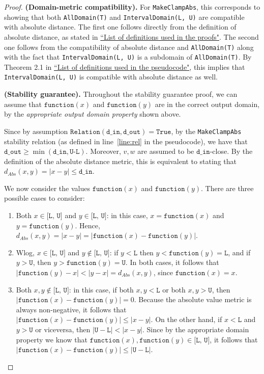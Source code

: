 \documentclass[11pt,a4paper]{article}
\theoremstyle{definition}
\newcommand{\din}{\texttt{d\_in}}
\newcommand{\dout}{\texttt{d\_out}}
\newcommand{\Relation}{\texttt{Relation}}
\newcommand{\True}{\texttt{True}}
\newcommand{\function}{\texttt{function}}
\newcommand{\silvia}[1]{{ {\color{blue}{(silvia)~#1}}}}
\begin{document}
\begin{proof}
\smallskip
\textbf{(Domain-metric compatibility).}  For \texttt{MakeClampAbs}, this corresponds to showing that both \texttt{AllDomain(T)} and \texttt{IntervalDomain(L, U)} are compatible with absolute distance. The first one follows directly from the definition of absolute distance, as stated in \href{https://www.overleaf.com/project/60d214e390b337703d200982}{``List of definitions used in the proofs"}. The second one follows from the compatibility of absolute distance and \texttt{AllDomain(T)} along with the fact that \texttt{IntervalDomain(L, U)} is a subdomain of \texttt{AllDomain(T)}. By Theorem 2.1 in \href{https://www.overleaf.com/project/60d215bf90b337ac02200a99}{``List of definitions used in the pseudocode"}, this implies that \texttt{IntervalDomain(L, U)} is compatible with absolute distance as well. 
    
\silvia{Flag: this is an example of the subdomain issues that we have been discussing during the week of July 19. Hence this paragraph might need some phrasing updates when the compatibility pairing constructor and the subdomain trait are implemented.}

\smallskip
\textbf{(Stability guarantee).} Throughout the stability guarantee proof, we can assume that $\function(x)$ and $\function(y)$ are in the correct output domain, by the \textit{appropriate output domain property} shown above. 

Since by assumption $\Relation(\din, \dout) = \True$, by the \texttt{MakeClampAbs} stability relation (as defined in line~\ref{line:rel} in the pseudocode), we have that $\dout \geq \min(\din, \texttt{U-L})$. Moreover, $v, w$ are assumed to be $\din$-close. By the definition of the absolute distance metric, this is equivalent to stating that $d_{Abs}(x, y) = |x - y| \leq \din$.

We now consider the values $\function(x)$ and $\function(y)$. There are three possible cases to consider:
\begin{enumerate}
    \item Both $x \in \texttt{[L, U]}$ and $y \in \texttt{[L, U]}$: in this case, $x = \function(x)$ and $y = \function(y)$. Hence, $d_{Abs}(x, y) = |x-y| = |\function(x) - \function(y)|$.
    \item Wlog, $x \in \texttt{[L, U]}$ and $y \notin \texttt{[L, U]}$: if $y < \texttt{L}$ then $y < \function(y) = \texttt{L}$, and if $y > \texttt{U}$, then $y > \function(y) = \texttt{U}$. In both cases, it follows that $|\function(y) - x| < |y - x| = d_{Abs}(x, y)$, since $\function(x) = x$.
    \item Both $x, y \notin \texttt{[L, U]}$: in this case, if both $x, y < \texttt{L}$ or both $x, y > \texttt{U}$, then $|\function(x) - \function(y)| = 0$. Because the absolute value metric is always non-negative, it follows that $|\function(x) - \function(y)| \leq |x - y|$. On the other hand, if $x < \texttt{L}$ and $y > \texttt{U}$ or viceversa, then $|\texttt{U}-\texttt{L}| < |x-y|$. Since by the appropriate domain property we know that $\function(x), \function(y) \in \texttt{[L, U]}$, it follows that $|\function(x) - \function(y)| \leq |\texttt{U}-\texttt{L}|$.
\end{enumerate}


\end{proof}
\end{document}
